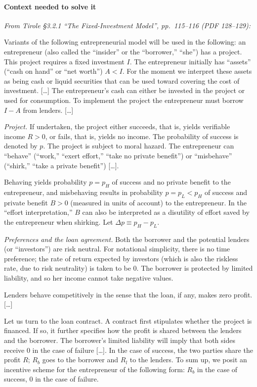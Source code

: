 \documentclass[11pt,a4paper]{article}
\begin{document}
\paragraph{Context needed to solve it}

\emph{From Tirole §3.2.1 ``The Fixed-Investment Model'', pp.~115--116 (PDF 128--129):}

Variants of the following entrepreneurial model will be used in the following: an entrepreneur (also
called the ``insider'' or the ``borrower,'' ``she'') has a project. This project requires a fixed
investment \(I\). The entrepreneur initially has ``assets'' (``cash on hand'' or ``net worth'')
\(A < I\). For the moment we interpret these assets as being cash or liquid securities that can be
used toward covering the cost of investment. {[}\ldots{]} The entrepreneur's cash can either be
invested in the project or used for consumption. To implement the project the entrepreneur must
borrow \(I - A\) from lenders. {[}\ldots{]}

\emph{Project.} If undertaken, the project either succeeds, that is, yields verifiable income
\(R > 0\), or fails, that is, yields no income. The probability of success is denoted by \(p\). The
project is subject to moral hazard. The entrepreneur can ``behave'' (``work,'' ``exert effort,''
``take no private benefit'') or ``misbehave'' (``shirk,'' ``take a private benefit'') {[}\ldots{]}.

Behaving yields probability \(p = p_H\) of success and no private benefit to the entrepreneur, and
misbehaving results in probability \(p = p_L < p_H\) of success and private benefit \(B > 0\)
(measured in units of account) to the entrepreneur. In the ``effort interpretation,'' \(B\) can also
be interpreted as a disutility of effort saved by the entrepreneur when shirking. Let
\(\Delta p \equiv p_H - p_L\).

\emph{Preferences and the loan agreement.} Both the borrower and the potential lenders (or
``investors'') are risk neutral. For notational simplicity, there is no time preference; the rate of
return expected by investors (which is also the riskless rate, due to risk neutrality) is taken to
be 0. The borrower is protected by limited liability, and so her income cannot take negative values.

Lenders behave competitively in the sense that the loan, if any, makes zero profit. {[}\ldots{]}

Let us turn to the loan contract. A contract first stipulates whether the project is financed. If
so, it further specifies how the profit is shared between the lenders and the borrower. The
borrower's limited liability will imply that both sides receive 0 in the case of failure
{[}\ldots{]}. In the case of success, the two parties share the profit \(R\); \(R_b\) goes to the
borrower and \(R_l\) to the lenders. To sum up, we posit an incentive scheme for the entrepreneur of
the following form: \(R_b\) in the case of success, 0 in the case of failure.
\end{document}
